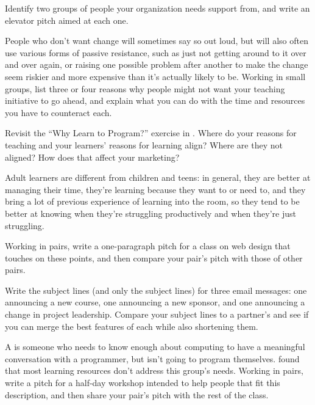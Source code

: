 Identify two groups of people your organization needs support from,
and write an elevator pitch aimed at each one.


People who don't want change will sometimes say so out loud, but will
also often use various forms of passive resistance, such as just not
getting around to it over and over again, or raising one possible
problem after another to make the change seem riskier and more
expensive than it's actually likely to be. Working in small groups,
list three or four reasons why people might not want your teaching
initiative to go ahead, and explain what you can do with the time and
resources you have to counteract each.


Revisit the ``Why Learn to Program?''  exercise in
.  Where do your reasons for teaching and
your learners' reasons for learning align?  Where are they not
aligned?  How does that affect your marketing?


Adult learners are different from children and teens: in general, they
are better at managing their time, they're learning because they want
to or need to, and they bring a lot of previous experience of learning
into the room, so they tend to be better at knowing when they're
struggling productively and when they're just struggling.

Working in pairs, write a one-paragraph pitch for a class on web
design that touches on these points, and then compare your pair's
pitch with those of other pairs.


Write the subject lines (and only the subject lines) for three email
messages: one announcing a new course, one announcing a new sponsor,
and one announcing a change in project leadership.  Compare your
subject lines to a partner's and see if you can merge the best
features of each while also shortening them.


A  is
someone who needs to know enough about computing to have a meaningful
conversation with a programmer, but isn't going to program themselves.
\cite{Wang2018} found that most learning resources don't address this
group's needs.  Working in pairs, write a pitch for a half-day
workshop intended to help people that fit this description, and then
share your pair's pitch with the rest of the class.
